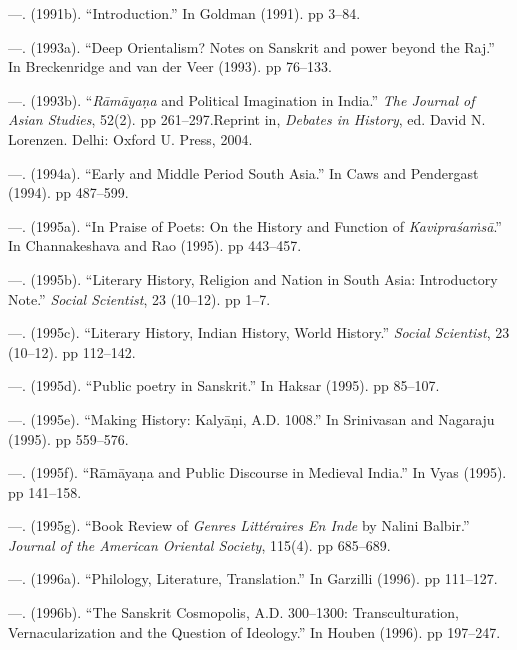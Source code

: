  \item —. (1991b). “Introduction.” In Goldman (1991). pp 3–84.

 \item —. (1993a). “Deep Orientalism? Notes on Sanskrit and power beyond the Raj.” In Breckenridge and van der Veer (1993). pp 76–133.

 \item —. (1993b). “\textit{Rāmāyaṇa} and Political Imagination in India.” \textit{The Journal of Asian Studies}, 52(2). pp 261–297.Reprint in, \textit{Debates in History}, ed. David N. Lorenzen. Delhi: Oxford U. Press, 2004.

 \item —. (1994a). “Early and Middle Period South Asia.” In Caws and Pendergast (1994). pp 487–599.

 \item —. (1995a). “In Praise of Poets: On the History and Function of \textit{Kavipraśaṁsā}.” In Channakeshava and Rao (1995). pp 443–457.

 \item —. (1995b). “Literary History, Religion and Nation in South Asia: Introductory Note.” \textit{Social Scientist}, 23 (10–12). pp 1–7.

 \item —. (1995c). “Literary History, Indian History, World History.” \textit{Social Scientist}, 23 (10–12). pp 112–142.

 \item —. (1995d). “Public poetry in Sanskrit.” In Haksar (1995). pp 85–107.

 \item —. (1995e). “Making History: Kalyāṇi, A.D. 1008.” In Srinivasan and Nagaraju (1995). pp 559–576.

 \item —. (1995f). “Rāmāyaṇa and Public Discourse in Medieval India.” In Vyas (1995). pp 141–158.

 \item —. (1995g). “Book Review of \textit{Genres Littéraires En Inde} by Nalini Balbir.” \textit{Journal of the American Oriental Society}, 115(4). pp 685–689.

 \item —. (1996a). “Philology, Literature, Translation.” In Garzilli (1996). pp 111–127.

 \item —. (1996b). “The Sanskrit Cosmopolis, A.D. 300–1300: Transculturation, Vernacularization and the Question of Ideology.” In Houben (1996). pp 197–247.


